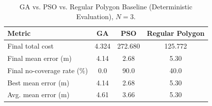 \begin{table}[t]
\centering
\caption{GA vs. PSO vs. Regular Polygon Baseline (Deterministic Evaluation), $N=3$.}
\label{tab:ga_pso_polygon_n3}
\begin{tabular}{lccc}
\hline
Metric & GA & PSO & Regular Polygon \\
\hline
Final total cost & 4.324 & 272.680 & 125.772 \\
Final mean error (m) & 4.14 & 2.68 & 5.30 \\
Final no-coverage rate (\%) & 0.0 & 90.0 & 40.0 \\
Best mean error (m) & 4.14 & 2.68 & 5.30 \\
Avg. mean error (m) & 4.61 & 3.66 & 5.30 \\
\hline
\end{tabular}
\end{table}
